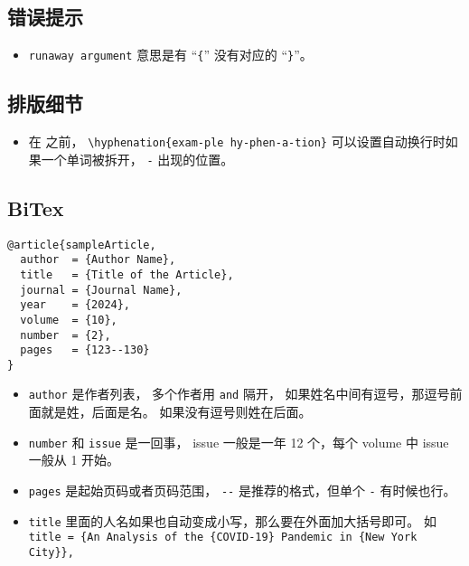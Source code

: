 
\begin{issues}
\issueDraft
\end{issues}

\subsection{错误提示}
\begin{itemize}
\item \verb`runaway argument` 意思是有 “\verb`{`” 没有对应的 “\verb`}`”。
\end{itemize}


\subsection{排版细节}
\begin{itemize}
\item 在 \verb`` 之前， \verb`\hyphenation{exam-ple hy-phen-a-tion}` 可以设置自动换行时如果一个单词被拆开， \verb`-` 出现的位置。
\end{itemize}

\subsection{BiTex}

\begin{lstlisting}[language=none, caption=BibTeX 的例子]
@article{sampleArticle,
  author  = {Author Name},
  title   = {Title of the Article},
  journal = {Journal Name},
  year    = {2024},
  volume  = {10},
  number  = {2},
  pages   = {123--130}
}
\end{lstlisting}

\begin{itemize}
\item \verb`author` 是作者列表， 多个作者用 \verb`and` 隔开， 如果姓名中间有逗号，那逗号前面就是姓，后面是名。 如果没有逗号则姓在后面。
\item \verb`number` 和 \verb`issue` 是一回事， issue 一般是一年 12 个，每个 volume 中 issue 一般从 1 开始。
\item \verb`pages` 是起始页码或者页码范围， \verb`--` 是推荐的格式，但单个 \verb`-` 有时候也行。
\item \verb`title` 里面的人名如果也自动变成小写，那么要在外面加大括号即可。 如 \verb`title = {An Analysis of the {COVID-19} Pandemic in {New York City}},`
\end{itemize}
